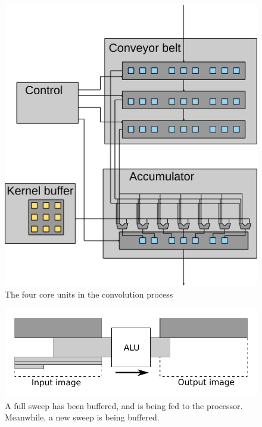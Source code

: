 \begin{figure}[h!]
    \includegraphics[width=\linewidth]{img/processor_overview_small.png}
    \caption{The four core units in the convolution process}
    \label{fig:processor_core}
\end{figure}

\begin{figure}[h!]
    \includegraphics[width=\linewidth]{img/daisy_processing.pdf}
    \caption[Buffering and feeding of sweeps]{A full sweep has been buffered, and is being fed to the processor. Meanwhile, a new sweep is being buffered.}
    \label{fig:sweep_feed}
\end{figure}

